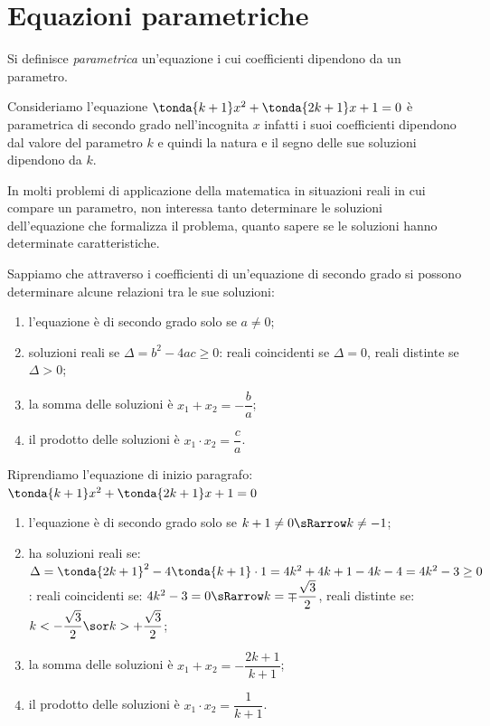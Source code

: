 \section{Equazioni parametriche}
\label{sec:eq2gr_parametriche}

\begin{definizione}{}{}
Si definisce \emph{parametrica} un'equazione i cui coefficienti dipendono 
da un parametro.
\end{definizione}

Consideriamo l'equazione \(\tonda{k +1}x^2 +\tonda{2k +1}x +1 = 0\) è 
parametrica di secondo grado nell'incognita \(x\) infatti i suoi 
coefficienti dipendono dal valore del parametro \(k\) e quindi la natura 
e il segno delle sue soluzioni dipendono da \(k\).

In molti problemi di applicazione della matematica in situazioni reali in 
cui compare un parametro, non interessa tanto determinare le soluzioni 
dell'equazione che formalizza il problema, quanto sapere se le soluzioni 
hanno determinate caratteristiche.

Sappiamo che attraverso i coefficienti di un'equazione di secondo grado si 
possono determinare alcune relazioni tra le sue soluzioni:
\begin{enumerate} [noitemsep]
\item l'equazione è di secondo grado solo se \(a \neq 0\);
\item soluzioni reali se \(\Delta = b^{2} -4 a c \geq 0\):
 \subitem reali coincidenti se \(\Delta = 0\), 
 \subitem reali distinte se \(\Delta > 0\);
\item la somma delle soluzioni è \(x_1 +x_2 = -\dfrac{b}{a}\);
\item il prodotto delle soluzioni è \(x_1 \cdot x_2 = \dfrac{c}{a}\).
\end{enumerate}

\begin{esempio}{}{}
Riprendiamo l'equazione di inizio paragrafo: \\
\(\tonda{k +1}x^2 +\tonda{2k +1}x +1 = 0\)
\begin{enumerate} [noitemsep]
\item l'equazione è di secondo grado solo se 
\(k +1 \neq 0 \sRarrow k \neq -1\);
\item ha soluzioni reali se: \\
\(\Delta = \tonda{2k +1}^{2} -4 \tonda{k +1} \cdot 1 = 
           4k^2 +4k +1 -4k -4 = 4k^2 -3 \geq 0\):
 \subitem reali coincidenti se: \quad 
 \(4k^2-3 = 0 \sRarrow k = \mp \dfrac{\sqrt{3}}{2}\), 
 \subitem reali distinte se: \quad 
 \(k < -\dfrac{\sqrt{3}}{2} \sor k > +\dfrac{\sqrt{3}}{2}\);
\item la somma delle soluzioni è 
\(x_1 +x_2 = -\dfrac{2k +1}{k+1}\);
\item il prodotto delle soluzioni è 
\(x_1 \cdot x_2 = \dfrac{1}{k+1}\).
\end{enumerate}
\end{esempio}

